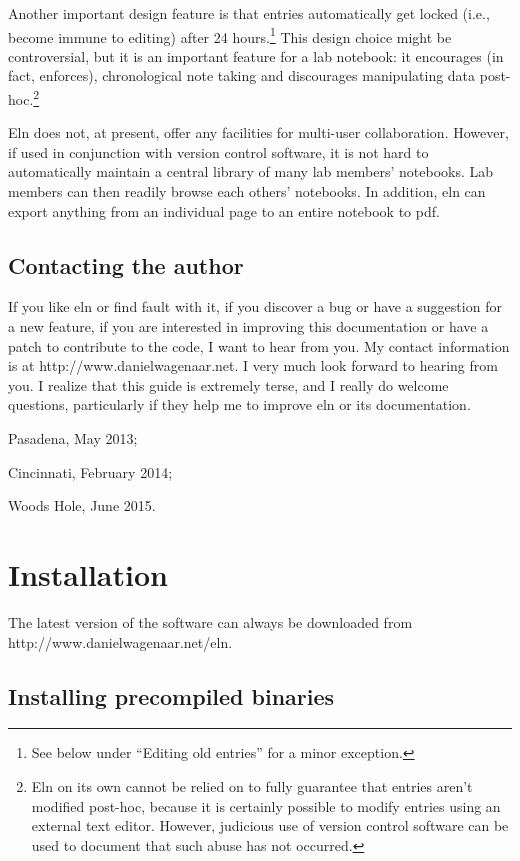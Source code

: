 \documentclass[11pt]{report}
\begin{document}
Another important design feature is that entries automatically get
locked (i.e., become immune to editing) after 24 hours.\footnote{See
  below under ``Editing old entries'' for a minor exception.} This
design choice might be controversial, but it is an important feature
for a lab notebook: it encourages (in fact, enforces), chronological
note taking and discourages manipulating data post-hoc.\footnote{Eln
  on its own cannot be relied on to fully guarantee that entries
  aren't modified post-hoc, because it is certainly possible to modify
  entries using an external text editor. However, judicious use of
  version control software can be used to document that such abuse has
  not occurred.}

Eln does not, at present, offer any facilities for multi-user
collaboration. However, if used in conjunction with version control
software, it is not hard to automatically maintain a central library of
many lab members' notebooks. Lab members can then readily browse each
others' notebooks. In addition, eln can export anything from an
individual page to an entire notebook to pdf.

\section{Contacting the author}

If you like eln or find fault with it, if you discover a bug or have a
suggestion for a new feature, if you are interested in improving this
documentation or have a patch to contribute to the code, I want to
hear from you. My contact information is at
http://www.danielwagenaar.net. I very much look forward to hearing
from you. I realize that this guide is extremely terse, and I
really do welcome questions, particularly if they help me to improve
eln or its documentation.\bigskip

\noindent Pasadena, May 2013;

\noindent Cincinnati, February 2014;

\noindent Woods Hole, June 2015.

\chapter{Installation}

The latest version of the software can always be downloaded from\break
http://www.danielwagenaar.net/eln.

\section{Installing precompiled binaries}
\end{document}
